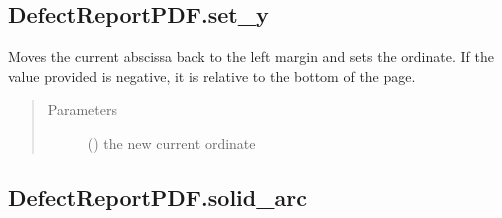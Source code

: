 \documentclass[letterpaper,10pt,english]{sphinxmanual}
\begin{document}
\begin{fulllineitems}
\begin{fulllineitems}
\end{fulllineitems}



\subsection{DefectReportPDF.set\_y}
\label{\detokenize{generated/quality_assessment.quality_pdf_report.DefectReportPDF.set_y:defectreportpdf-set-y}}\label{\detokenize{generated/quality_assessment.quality_pdf_report.DefectReportPDF.set_y::doc}}

\begin{fulllineitems}
\label{\detokenize{generated/quality_assessment.quality_pdf_report.DefectReportPDF.set_y:quality_assessment.quality_pdf_report.DefectReportPDF.set_y}}
\sphinxAtStartPar
Moves the current abscissa back to the left margin and sets the ordinate.
If the value provided is negative, it is relative to the bottom of the page.
\begin{quote}\begin{description}
\item[{Parameters}] \leavevmode
\sphinxAtStartPar
{} () \textendash{} the new current ordinate

\end{description}\end{quote}

\end{fulllineitems}



\subsection{DefectReportPDF.solid\_arc}
\label{\detokenize{generated/quality_assessment.quality_pdf_report.DefectReportPDF.solid_arc:defectreportpdf-solid-arc}}\label{\detokenize{generated/quality_assessment.quality_pdf_report.DefectReportPDF.solid_arc::doc}}


\end{fulllineitems}
\end{document}

